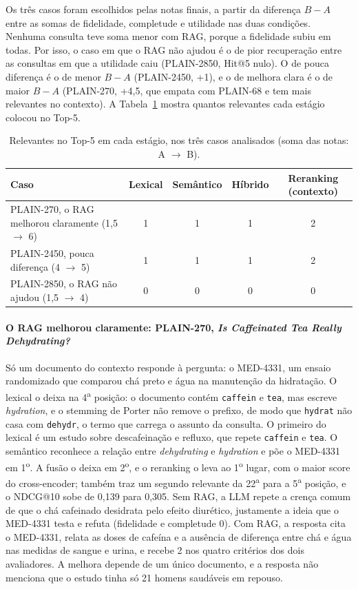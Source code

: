 \documentclass[11pt,a4paper]{article}
\newcommand{\cod}[1]{\texttt{#1}}
\begin{document}
Os três casos foram escolhidos pelas notas finais, a partir da diferença $B-A$ entre as somas de fidelidade, completude e utilidade nas duas condições. Nenhuma consulta teve soma menor com RAG, porque a fidelidade subiu em todas. Por isso, o caso em que o RAG não ajudou é o de pior recuperação entre as consultas em que a utilidade caiu (PLAIN-2850, Hit@5 nulo). O de pouca diferença é o de menor $B-A$ (PLAIN-2450, +1), e o de melhora clara é o de maior $B-A$ (PLAIN-270, +4,5, que empata com PLAIN-68 e tem mais relevantes no contexto). A Tabela~\ref{tab:estagios} mostra quantos relevantes cada estágio colocou no Top-5.

\begin{table}[!htb]
\centering\small
\caption{Relevantes no Top-5 em cada estágio, nos três casos analisados (soma das notas: A $\rightarrow$ B).}
\label{tab:estagios}
\begin{tabular}{lcccc}
\toprule
Caso & Lexical & Semântico & Híbrido & Reranking (contexto) \\
\midrule
PLAIN-270, o RAG melhorou claramente (1,5 $\rightarrow$ 6) & 1 & 1 & 1 & 2 \\
PLAIN-2450, pouca diferença (4 $\rightarrow$ 5) & 1 & 1 & 1 & 2 \\
PLAIN-2850, o RAG não ajudou (1,5 $\rightarrow$ 4) & 0 & 0 & 0 & 0 \\
\bottomrule
\end{tabular}
\end{table}

\paragraph{O RAG melhorou claramente: PLAIN-270, \emph{Is Caffeinated Tea Really Dehydrating?}} Só um documento do contexto responde à pergunta: o MED-4331, um ensaio randomizado que comparou chá preto e água na manutenção da hidratação. O lexical o deixa na 4\textsuperscript{a} posição: o documento contém \cod{caffein} e \cod{tea}, mas escreve \emph{hydration}, e o stemming de Porter não remove o prefixo, de modo que \cod{hydrat} não casa com \cod{dehydr}, o termo que carrega o assunto da consulta. O primeiro do lexical é um estudo sobre descafeinação e refluxo, que repete \cod{caffein} e \cod{tea}. O semântico reconhece a relação entre \emph{dehydrating} e \emph{hydration} e põe o MED-4331 em 1\textsuperscript{o}. A fusão o deixa em 2\textsuperscript{o}, e o reranking o leva ao 1\textsuperscript{o} lugar, com o maior score do cross-encoder; também traz um segundo relevante da 22\textsuperscript{a} para a 5\textsuperscript{a} posição, e o NDCG@10 sobe de 0,139 para 0,305. Sem RAG, a LLM repete a crença comum de que o chá cafeinado desidrata pelo efeito diurético, justamente a ideia que o MED-4331 testa e refuta (fidelidade e completude 0). Com RAG, a resposta cita o MED-4331, relata as doses de cafeína e a ausência de diferença entre chá e água nas medidas de sangue e urina, e recebe 2 nos quatro critérios dos dois avaliadores. A melhora depende de um único documento, e a resposta não menciona que o estudo tinha só 21 homens saudáveis em repouso.
\end{document}
